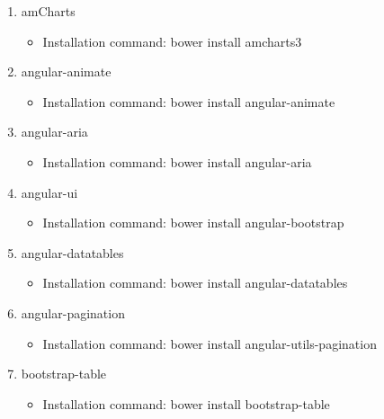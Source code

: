 \documentclass[a4paper,12pt,oneside]{book}
\begin{document}
\begin{enumerate}
\begin{itemize}
\begin{enumerate}
\begin{itemize}
                        \end{itemize}
                    \item{amCharts}
                        \begin{itemize}
                            \item{Installation command: bower install amcharts3}
                        \end{itemize}
                    \item{angular-animate}
                        \begin{itemize}
                            \item{Installation command: bower install angular-animate}
                        \end{itemize}
                    \item{angular-aria}
                        \begin{itemize}
                            \item{Installation command: bower install angular-aria}
                        \end{itemize}
                    \item{angular-ui}
                        \begin{itemize}
                            \item{Installation command: bower install angular-bootstrap}
                        \end{itemize}
                    \item{angular-datatables}
                        \begin{itemize}
                            \item{Installation command: bower install angular-datatables}
                        \end{itemize}
                    \item{angular-pagination}
                        \begin{itemize}
                            \item{Installation command: bower install angular-utils-pagination}
                        \end{itemize}
                \item{bootstrap-table}
                    \begin{itemize}
                        \item{Installation command: bower install bootstrap-table}
                    \end{itemize}

\end{enumerate}
\end{itemize}
\end{enumerate}
\end{document}

